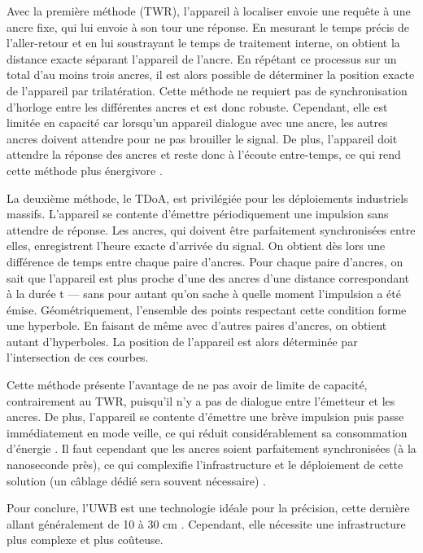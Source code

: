 \documentclass[11pt, a4paper]{article}
\begin{document}
Avec la première méthode (TWR), l’appareil à localiser envoie une requête à une ancre fixe, qui lui envoie à son tour une réponse. En mesurant le temps précis de l’aller-retour et en lui soustrayant le temps de traitement interne, on obtient la distance exacte séparant l’appareil de l’ancre. En répétant ce processus sur un total d’au moins trois ancres, il est alors possible de déterminer la position exacte de l’appareil par trilatération. Cette méthode ne requiert pas de synchronisation d’horloge entre les différentes ancres et est donc robuste. Cependant, elle est limitée en capacité car lorsqu’un appareil dialogue avec une ancre, les autres ancres doivent attendre pour ne pas brouiller le signal. De plus, l’appareil doit attendre la réponse des ancres et reste donc à l’écoute entre-temps, ce qui rend cette méthode plus énergivore \cite{alarifiUltraWidebandIndoor2016}.

La deuxième méthode, le TDoA, est privilégiée pour les déploiements industriels massifs. L’appareil se contente d’émettre périodiquement une impulsion sans attendre de réponse. Les ancres, qui doivent être parfaitement synchronisées entre elles, enregistrent l’heure exacte d’arrivée du signal. On obtient dès lors une différence de temps entre chaque paire d’ancres. Pour chaque paire d’ancres, on sait que l’appareil est plus proche d’une des ancres d’une distance correspondant à la durée t — sans pour autant qu’on sache à quelle moment l’impulsion a été émise. Géométriquement, l’ensemble des points respectant cette condition forme une hyperbole. En faisant de même avec d’autres paires d'ancres, on obtient autant d’hyperboles. La position de l’appareil est alors déterminée par l’intersection de ces courbes.

Cette méthode présente l’avantage de ne pas avoir de limite de capacité, contrairement au TWR, puisqu’il n’y a pas de dialogue entre l’émetteur et les ancres. De plus, l’appareil se contente d’émettre une brève impulsion puis passe immédiatement en mode veille, ce qui réduit considérablement sa consommation d’énergie \cite{alarifiUltraWidebandIndoor2016}. Il faut cependant que les ancres soient parfaitement synchronisées (à la nanoseconde près), ce qui complexifie l’infrastructure et le déploiement de cette solution (un câblage dédié sera souvent nécessaire) \cite{rinaldiExperimentalCharacterizationChain2022}.

Pour conclure, l’UWB est une technologie idéale pour la précision, cette dernière allant généralement de 10 à 30 cm \cite{khoshrangbafExperimentalEvaluationIndoor2025, obeidatReviewIndoorLocalization2021}. Cependant, elle nécessite une infrastructure plus complexe et plus coûteuse.
\end{document}
